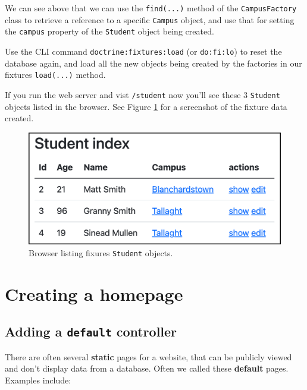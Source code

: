 \documentclass[a4paperpaper,openright]{book}
\begin{document}
We can see above that we can use the \texttt{find(...)} method of the
\texttt{CampusFactory} class to retrieve a reference to a specific
\texttt{Campus} object, and use that for setting the \texttt{campus}
property of the \texttt{Student} object being created.

Use the CLI command \texttt{doctrine:fixtures:load} (or
\texttt{do:fi:lo}) to reset the database again, and load all the new
objects being created by the factories in our fixtures
\texttt{load(...)} method.

If you run the web server and vist \texttt{/student} now you'll see
these 3 \texttt{Student} objects listed in the browser. See Figure
\ref{student_fixtures} for a screenshot of the fixture data created.

\begin{figure}
\centering
\includegraphics[width=1\textwidth,height=\textheight]{./tex2pdf.-564b08cce17d66dc/4a9477e0a614fb4c29a9fdb9fd72188e30ab4a6d.png}
\caption{Browser listing fixures \texttt{Student}
objects.\label{student_fixtures}}
\end{figure}

\hypertarget{creating-a-homepage}{%
\chapter{Creating a homepage}\label{creating-a-homepage}}

\hypertarget{adding-a-default-controller}{%
\section{\texorpdfstring{Adding a \texttt{default}
controller}{Adding a default controller}}\label{adding-a-default-controller}}

There are often several \textbf{static} pages for a website, that can be
publicly viewed and don't display data from a database. Often we called
these \textbf{default} pages. Examples include:
\end{document}
